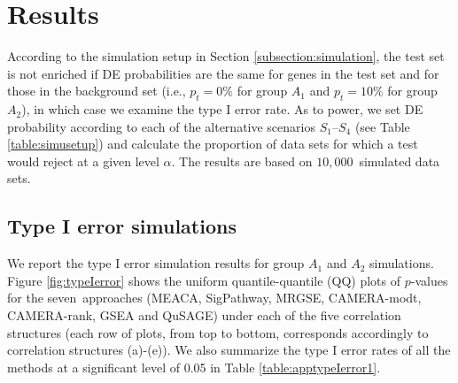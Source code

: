 \documentclass[a4,center,fleqn]{NAR}
\newcommand{\OurMethod}{MEACA}
\newcommand{\aaCase}{a}
\newcommand{\fCase}{e}
\newcommand{\CMR}{CAMERA-rank}
\newcommand{\CMT}{CAMERA-modt}
\newcommand{\gent}{SigPathway}
\newcommand{\genr}{MRGSE}
\newcommand{\HowmanySimu}{$10,000$}
\begin{document}
	
	\section{Results}\label{section:results}
			
	According to the simulation setup in Section \ref{subsection:simulation}, the test set is not
	enriched if DE probabilities are the same for genes in the test set and for those in the 
	background set (i.e., $p_t =0\%$ for group $A_1$ and $p_t = 10\%$ for group $A_2$), in which 
	case we	examine the type I error rate. As to power, we set DE probability according to each of 
	the alternative scenarios $S_1$--$S_4$ (see Table \ref{table:simusetup}) and calculate the 
	proportion of data sets for which a test would reject at a given level $\alpha$. The results 
	are based on \HowmanySimu~simulated data sets. 

	
	\subsection{Type I error simulations}\label{subsection:typeIerror}

	We report the type I error simulation results for group $A_1$ and $A_2$ simulations. Figure
	\ref{fig:typeIerror} shows the uniform quantile-quantile (QQ) plots of $p$-values for the
	seven~approaches (\OurMethod, \gent, \genr, \CMT, \CMR, GSEA and QuSAGE) under each of the five
	correlation structures (each row of plots, from top to
	bottom, corresponds accordingly to correlation structures (\aaCase)-(\fCase)). We also 
	summarize the type I error rates of all the methods at a significant level of 0.05 in 
	Table \ref{table:apptypeIerror1}.
	
\end{document}
